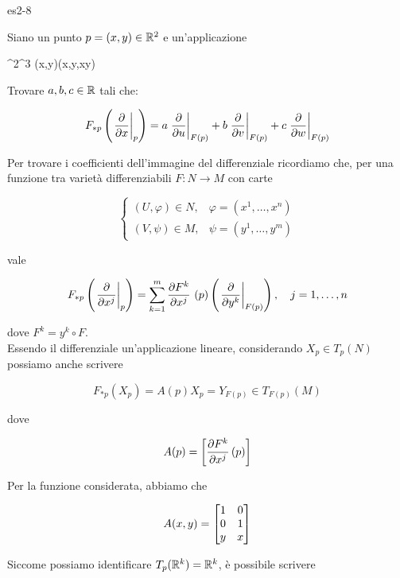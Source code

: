 {es2-8}
{
Siano un punto $ p = (x,y) \in \mathbb{R}^{2} $ e un'applicazione

	{\R^{2}}{\R^{3}}
	{(x,y)}{(x,y,xy)}

Trovare $ a,b,c \in \mathbb{R} $ tali che:

\begin{equation}
	F_{*p} \left( \eval{ \pdv{x} }_{p} \right) = a \eval{ \pdv{u} }_{F(p)} + b \eval{ \pdv{v} }_{F(p)} + c \eval{ \pdv{w} }_{F(p)}
\end{equation}
}
{
Per trovare i coefficienti dell'immagine del differenziale ricordiamo che, per una funzione tra varietà differenziabili $ F : N \to M $ con carte

\begin{equation}
	\begin{cases}
		(U,\varphi) \in N, & \varphi = (x^{1},\dots,x^{n}) \\
		(V,\psi) \in M, & \psi = (y^{1},\dots,y^{m})
	\end{cases}
\end{equation}

vale

\begin{equation}
	F_{*p} \left( \eval{\pdv{x^{j}}}_{p} \right) = \sum_{k=1}^{m} \pdv{F^{k}}{x^{j}}\ (p) \left( \eval{\pdv{y^{k}}}_{F(p)} \right) \qcomma j = 1,\dots,n
\end{equation}

dove $ F^{k} = y^{k} \circ F $. \\
Essendo il differenziale un'applicazione lineare, considerando $ X_{p} \in T_{p}(N) $ possiamo anche scrivere

\begin{equation}
	F_{*p} (X_{p}) = A(p) X_{p} = Y_{F(p)} \in T_{F(p)}(M)
\end{equation}

dove

\begin{equation}
	A(p) = \left[ \pdv{F^{k}}{x^{j}} \, (p) \right]
\end{equation}

Per la funzione considerata, abbiamo che

\begin{equation}
	A(x,y) = \bmqty{ 1 & 0 \\ 0 & 1 \\ y & x }
\end{equation}

Siccome possiamo identificare $ T_{p}(\mathbb{R}^{k}) = \mathbb{R}^{k} $, è possibile scrivere

}
